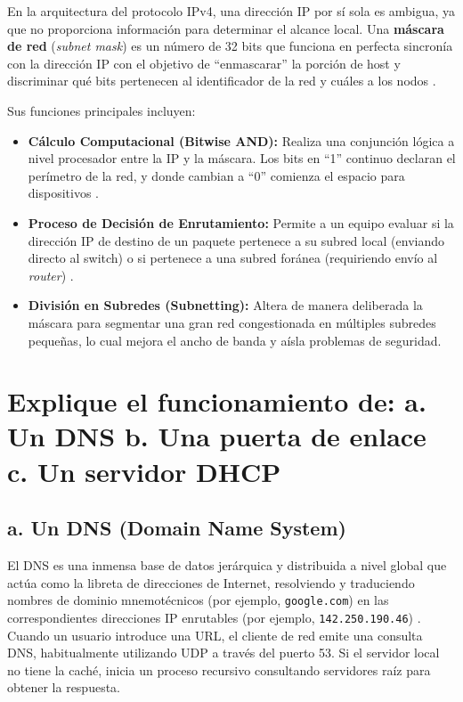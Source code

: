 \documentclass[a4paper,12pt]{article}
\begin{document}
En la arquitectura del protocolo IPv4, una dirección IP por sí sola es ambigua, ya que no proporciona información para determinar el alcance local. Una \textbf{máscara de red} (\textit{subnet mask}) es un número de 32 bits que funciona en perfecta sincronía con la dirección IP con el objetivo de ``enmascarar'' la porción de host y discriminar qué bits pertenecen al identificador de la red y cuáles a los nodos \cite{ref13}.

Sus funciones principales incluyen:
\begin{itemize}
    \item \textbf{Cálculo Computacional (Bitwise AND):} Realiza una conjunción lógica a nivel procesador entre la IP y la máscara. Los bits en ``1'' continuo declaran el perímetro de la red, y donde cambian a ``0'' comienza el espacio para dispositivos \cite{ref13}.
    \item \textbf{Proceso de Decisión de Enrutamiento:} Permite a un equipo evaluar si la dirección IP de destino de un paquete pertenece a su subred local (enviando directo al switch) o si pertenece a una subred foránea (requiriendo envío al \textit{router}) \cite{ref13}.
    \item \textbf{División en Subredes (Subnetting):} Altera de manera deliberada la máscara para segmentar una gran red congestionada en múltiples subredes pequeñas, lo cual mejora el ancho de banda y aísla problemas de seguridad.
\end{itemize}

\section{Explique el funcionamiento de: a. Un DNS b. Una puerta de enlace c. Un servidor DHCP}

\subsection*{a. Un DNS (Domain Name System)}
El DNS es una inmensa base de datos jerárquica y distribuida a nivel global que actúa como la libreta de direcciones de Internet, resolviendo y traduciendo nombres de dominio mnemotécnicos (por ejemplo, \texttt{google.com}) en las correspondientes direcciones IP enrutables (por ejemplo, \texttt{142.250.190.46}) \cite{ref3}. Cuando un usuario introduce una URL, el cliente de red emite una consulta DNS, habitualmente utilizando UDP a través del puerto 53. Si el servidor local no tiene la caché, inicia un proceso recursivo consultando servidores raíz para obtener la respuesta.
\end{document}
